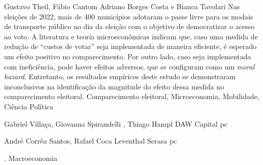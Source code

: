 \documentclass[
    10pt, 
    a4paper, 
    draft
    ]{article}
\begin{document}
\tableofcontents

    {Gustavo Theil, Fábio Cantom}
    {Adriano Borges Costa e Bianca Tavolari}
    {
        Nas eleições de 2022, mais de 400 municípios adotaram o passe livre para os modais de transporte público no dia da eleição com o objetivo de democratizar o acesso ao voto. A literatura e teoria microeconômicas indicam que, caso uma medida de redução de ``custos de votar'' seja implementada de maneira eficiente, é esperado um efeito positivo no comparecimento. Por outro lado, caso seja implementada com ineficiência, pode haver efeitos adversos, que se configuram como um \textit{moral hazard}. Entretanto, os resultados empíricos deste estudo se demonstraram inconclusivos na identificação da magnitude do efeito dessa medida no comparecimento eleitoral. 
    }
    {Comparecimento eleitoral, Microeconomia, Mobilidade, Ciência Política}




    {Gabriel Villaça, Giovanna Spirandelli , Thiago Hampl}
    {DAW Capital}
    {\lipsum[1-1]}
    {pc}



    {André Corrêa Santos, Rafael Coca Leventhal}
    {Serasa}
    {\lipsum[1-1]}
    {pc}



    {.}
    {}
    {\lipsum[1-1]}
    {Macroeconomia}






\clearpage

\nocite{*}

\printbibliography

\appendix
\end{document}
